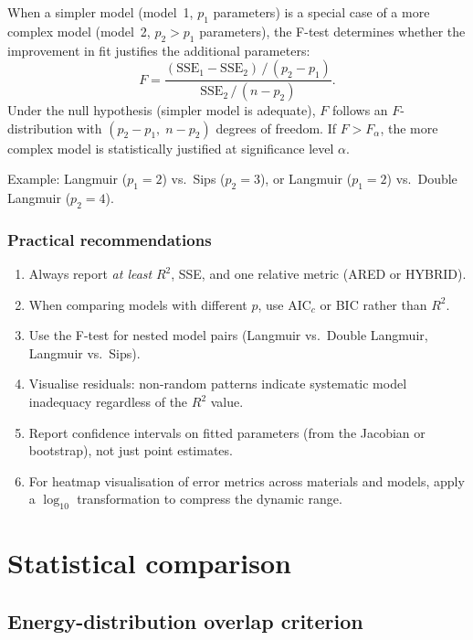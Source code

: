 \documentclass[12pt]{article}
\begin{document}
	When a simpler model (model~1, $p_1$ parameters) is a special case
	of a more complex model (model~2, $p_2 > p_1$ parameters), the
	F-test determines whether the improvement in fit justifies the
	additional parameters:
	\begin{equation}
		F = \frac{(\mathrm{SSE}_1 - \mathrm{SSE}_2)\,/\,
			(p_2 - p_1)}
		{\mathrm{SSE}_2\,/\,(n - p_2)}.
		\label{eq:Ftest}
	\end{equation}
	Under the null hypothesis (simpler model is adequate), $F$ follows
	an $F$-distribution with $(p_2 - p_1,\; n - p_2)$ degrees of
	freedom. If $F > F_{\alpha}$, the more complex model is
	statistically justified at significance level $\alpha$.

	Example: Langmuir ($p_1 = 2$) vs.\ Sips ($p_2 = 3$), or
	Langmuir ($p_1 = 2$) vs.\ Double Langmuir ($p_2 = 4$).

	\subsubsection{Practical recommendations}

	\begin{enumerate}
		\item Always report \emph{at least} $R^{2}$, SSE, and one
		relative metric (ARED or HYBRID).
		\item When comparing models with different $p$, use AIC$_c$
		or BIC rather than $R^{2}$.
		\item Use the F-test for nested model pairs
		(Langmuir vs.\ Double Langmuir, Langmuir vs.\ Sips).
		\item Visualise residuals: non-random patterns indicate
		systematic model inadequacy regardless of the $R^{2}$ value.
		\item Report confidence intervals on fitted parameters
		(from the Jacobian or bootstrap), not just point estimates.
		\item For heatmap visualisation of error metrics across
		materials and models, apply a $\log_{10}$ transformation to
		compress the dynamic range.
	\end{enumerate}

	\section{Statistical comparison}
	\subsection{Energy-distribution overlap criterion}
\end{document}
